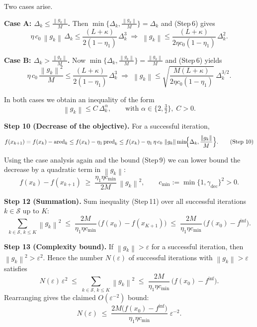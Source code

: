 \documentclass{article}
\newcommand{\norm}[1]{\left\lVert #1\right\rVert}
\begin{document}
Two cases arise.

\medskip
\noindent\textbf{Case A: $\Delta_{k}\le \frac{\norm{g_{k}}}{M}$.}  
Then $\min\{\Delta_{k},\frac{\norm{g_{k}}}{M}\}=\Delta_{k}$ and (Step 6) gives
\[
\eta\,c_{0}\,\norm{g_{k}}\,\Delta_{k}
\le \frac{(L+\kappa)}{2(1-\eta_{1})}\,\Delta_{k}^{3}
\;\Longrightarrow\;
\norm{g_{k}} \le
\frac{(L+\kappa)}{2\eta c_{0}(1-\eta_{1})}\,\Delta_{k}^{2}.
\tag{Step 7}
\]

\noindent\textbf{Case B: $\Delta_{k}> \frac{\norm{g_{k}}}{M}$.}  
Now $\min\{\Delta_{k},\frac{\norm{g_{k}}}{M}\}= \frac{\norm{g_{k}}}{M}$ and (Step 6) yields
\[
\eta\,c_{0}\,\frac{\norm{g_{k}}^{2}}{M}
\le \frac{(L+\kappa)}{2(1-\eta_{1})}\,\Delta_{k}^{3}
\;\Longrightarrow\;
\norm{g_{k}} \le
\sqrt{\frac{M(L+\kappa)}{2\eta c_{0}(1-\eta_{1})}}\;\Delta_{k}^{3/2}.
\tag{Step 8}
\]

In both cases we obtain an inequality of the form
\[
\norm{g_{k}} \le C\,\Delta_{k}^{\alpha},
\qquad\text{with }\alpha\in\{2,\tfrac32\},\; C>0.
\tag{Step 9}
\]

\noindent\textbf{Step 10 (Decrease of the objective).}  
For a successful iteration,
\[
f(x_{k+1}) = f(x_{k})-\operatorname{ared}_{k}
\le f(x_{k})-\eta_{1}\operatorname{pred}_{k}
\le f(x_{k})-\eta_{1}\,\eta\,c_{0}\,\norm{g_{k}}\min\!\Bigl\{\Delta_{k},\frac{\norm{g_{k}}}{M}\Bigr\}.
\tag{Step 10}
\]

Using the case analysis again and the bound (Step 9) we can lower bound the decrease by a quadratic term in $\norm{g_{k}}$:
\[
f(x_{k})-f(x_{k+1}) \;\ge\; \frac{\eta_{1}\eta c_{\min}}{2M}\,\norm{g_{k}}^{2},
\qquad
c_{\min}:=\min\{1,\gamma_{\text{dec}}\}^{2}>0.
\tag{Step 11}
\]

\noindent\textbf{Step 12 (Summation).}  
Sum inequality (Step 11) over all successful iterations $k\in\mathcal{S}$ up to $K$:
\[
\sum_{k\in\mathcal{S},\,k\le K}\norm{g_{k}}^{2}
\;\le\; \frac{2M}{\eta_{1}\eta c_{\min}}\,
\bigl(f(x_{0})-f(x_{K+1})\bigr)
\;\le\; \frac{2M}{\eta_{1}\eta c_{\min}}\,
\bigl(f(x_{0})-f^{\inf}\bigr).
\tag{Step 12}
\]

\noindent\textbf{Step 13 (Complexity bound).}  
If $\norm{g_{k}}>\varepsilon$ for a successful iteration, then $\norm{g_{k}}^{2}>\varepsilon^{2}$.  
Hence the number $N(\varepsilon)$ of successful iterations with $\norm{g_{k}}>\varepsilon$ satisfies
\[
N(\varepsilon)\,\varepsilon^{2}
\;\le\; \sum_{k\in\mathcal{S},\,k\le K}\norm{g_{k}}^{2}
\;\le\; \frac{2M}{\eta_{1}\eta c_{\min}}\,
\bigl(f(x_{0})-f^{\inf}\bigr).
\]
Rearranging gives the claimed $O(\varepsilon^{-2})$ bound:
\[
N(\varepsilon)\;\le\;
\frac{2M\bigl(f(x_{0})-f^{\inf}\bigr)}{\eta_{1}\eta c_{\min}}\;\varepsilon^{-2}.
\tag{Step 13}
\]
\end{document}
